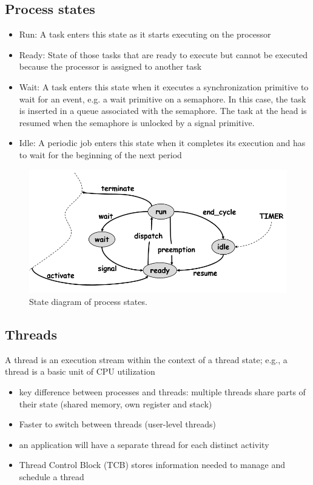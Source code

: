 \subsection{Process states}
\begin{itemize}[noitemsep]
\item Run: A task enters this state as it starts executing on the processor
\item Ready: State of those tasks that are ready to execute but cannot be executed because the processor is assigned to another task
\item Wait: A task enters this state when it executes a synchronization primitive to wait for an event, e.g. a wait primitive on a semaphore. In this case, the task is inserted in a queue associated with the semaphore. The task at the head is resumed when the semaphore is unlocked by a signal primitive.
\item Idle: A periodic job enters this state when it completes its execution and has to wait for the beginning of the next period
\end{itemize}

\begin{figure}[ht]
	\centering
  	\includegraphics[scale=0.5]{img/6_process_states.png}
	\caption{State diagram of process states.}
	\label{fig_process_states}
\end{figure}

\subsection{Threads}
\begin{definition}[Thread]
A 
thread
is an execution stream within the context of a thread state; e.g., a thread is a basic unit of CPU utilization
\end{definition}

\begin{itemize}[noitemsep]
\item key difference between processes and threads: multiple threads share parts of their state (shared memory, own register and stack)
\item Faster to switch between threads (user-level threads)
\item an application will have a separate  thread for each distinct activity
\item Thread Control Block (TCB) stores information needed to manage and schedule a thread
\end{itemize}

